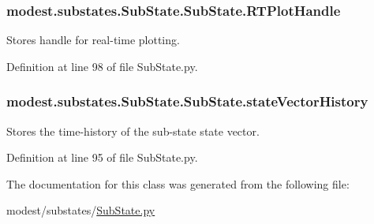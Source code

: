 \subsubsection[{\texorpdfstring{R\+T\+Plot\+Handle}{RTPlotHandle}}]{\setlength{\rightskip}{0pt plus 5cm}modest.\+substates.\+Sub\+State.\+Sub\+State.\+R\+T\+Plot\+Handle}\hypertarget{classmodest_1_1substates_1_1SubState_1_1SubState_a28d5d778050affd247711bab8b126e80}{}\label{classmodest_1_1substates_1_1SubState_1_1SubState_a28d5d778050affd247711bab8b126e80}


Stores handle for real-\/time plotting. 



Definition at line 98 of file Sub\+State.\+py.

\subsubsection[{\texorpdfstring{state\+Vector\+History}{stateVectorHistory}}]{\setlength{\rightskip}{0pt plus 5cm}modest.\+substates.\+Sub\+State.\+Sub\+State.\+state\+Vector\+History}\hypertarget{classmodest_1_1substates_1_1SubState_1_1SubState_acb24540b23c1fb76233b6b4ff5bf47ce}{}\label{classmodest_1_1substates_1_1SubState_1_1SubState_acb24540b23c1fb76233b6b4ff5bf47ce}


Stores the time-\/history of the sub-\/state state vector. 



Definition at line 95 of file Sub\+State.\+py.



The documentation for this class was generated from the following file\+:\begin{DoxyCompactItemize}
\item 
modest/substates/\hyperlink{SubState_8py}{Sub\+State.\+py}\end{DoxyCompactItemize}
